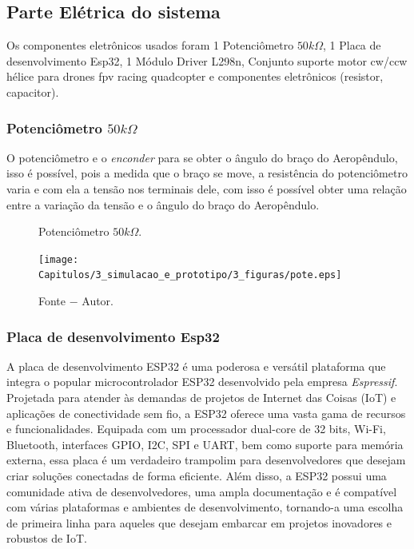 \subsection{Parte Elétrica do sistema}

Os componentes eletrônicos usados foram 1 Potenciômetro $50k\Omega$, 1 Placa de desenvolvimento Esp32, 1 Módulo Driver L298n, 
Conjunto suporte motor cw/ccw hélice para drones fpv racing quadcopter e componentes eletrônicos (resistor, capacitor).

\subsubsection{Potenciômetro $50k\Omega$}

O potenciômetro e o \textit{enconder} para se obter o ângulo do braço do Aeropêndulo, isso é possível, pois a medida que o braço se move, a resistência do potenciômetro varia e com ela a tensão nos terminais dele, com isso é possível obter uma relação entre a variação da tensão e o ângulo do braço do Aeropêndulo.

\begin{figure}[!h]
	\centering
	\caption{Potenciômetro $50k\Omega$.}
	\texttt{[image: Capitulos/3\_simulacao\_e\_prototipo/3\_figuras/pote.eps]}
	\caption*{Fonte $-$ Autor.}
	\label{fig3:image_04}
\end{figure}




\subsubsection{Placa de desenvolvimento Esp32}

A placa de desenvolvimento ESP32 é uma poderosa e versátil plataforma que integra o popular microcontrolador ESP32 desenvolvido pela empresa  \textit{Espressif}. Projetada para atender às demandas de projetos de Internet das Coisas (IoT) e aplicações de conectividade sem fio, a ESP32 oferece uma vasta gama de recursos e funcionalidades. Equipada com um processador dual-core de 32 bits, Wi-Fi, Bluetooth, interfaces GPIO, I2C, SPI e UART, bem como suporte para memória externa, essa placa é um verdadeiro trampolim para desenvolvedores que desejam criar soluções conectadas de forma eficiente. Além disso, a ESP32 possui uma comunidade ativa de desenvolvedores, uma ampla documentação e é compatível com várias plataformas e ambientes de desenvolvimento, tornando-a uma escolha de primeira linha para aqueles que desejam embarcar em projetos inovadores e robustos de IoT.

